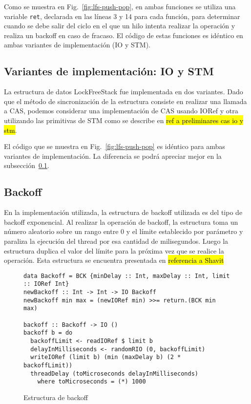 Como se muestra en Fig.~\ref{fig:lfs-push-pop}, en ambas funciones se utiliza una variable \texttt{ret}, declarada en las líneas 3 y 14 para cada función, para determinar cuando se debe salir del ciclo en el que un hilo intenta realizar la operación y realiza un backoff en caso de fracaso. El código de estas funciones es idéntico en ambas variantes de implementación (IO y STM).

\subsection{Variantes de implementación: IO y STM}\label{sub:lfs-variants}
La estructura de datos LockFreeStack fue implementada en dos variantes. Dado que el método de sincronización de la estructura consiste en realizar una llamada a CAS, podemos considerar una implementación de CAS usando IORef y otra utilizando las primitivas de STM como se describe en \hl{ref a preliminares cas io y stm}.

El código que se muestra en Fig.~\ref{fig:lfs-push-pop} es idéntico para ambas variantes de implementación. La diferencia se podrá apreciar mejor en la subsección~\ref{sub:lfs-variants}.

\clearpage
\subsection{Backoff}\label{sub:backoff}
En la implementación utilizada, la estructura de backoff utilizada es del tipo de backoff exponencial. Al realizar la operación de backoff, la estructura toma un número aleatorio sobre un rango entre 0 y el límite establecido por parámetro y paraliza la ejecución del thread por esa cantidad de milisegundos. Luego la estructura duplica el valor del límite para la próxima vez que se realice la operación. Esta estructura se encuentra presentada en \hl{referencia a Shavit}

\begin{figure}[H]
\begin{verbatim}
data Backoff = BCK {minDelay :: Int, maxDelay :: Int, limit :: IORef Int}
newBackoff :: Int -> Int -> IO Backoff
newBackoff min max = (newIORef min) >>= return.(BCK min max)

backoff :: Backoff -> IO ()
backoff b = do
  backoffLimit <- readIORef $ limit b
  delayInMilliseconds <- randomRIO (0, backoffLimit)
  writeIORef (limit b) (min (maxDelay b) (2 * backoffLimit))
  threadDelay (toMicroseconds delayInMilliseconds)
    where toMicroseconds = (*) 1000
\end{verbatim}
\caption{Estructura de backoff}
\label{fig:backoff-code}
\end{figure}

